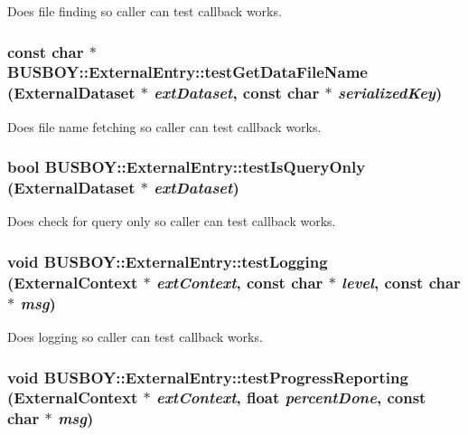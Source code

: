 Does file finding so caller can test callback works. \hypertarget{classBUSBOY_1_1ExternalEntry_af28fbb5390f40892e2fce951a31d8d97}{
\subsubsection[{testGetDataFileName}]{\setlength{\rightskip}{0pt plus 5cm}const char $\ast$ BUSBOY::ExternalEntry::testGetDataFileName ({\bf ExternalDataset} $\ast$ {\em extDataset}, \/  const char $\ast$ {\em serializedKey})}}
\label{classBUSBOY_1_1ExternalEntry_af28fbb5390f40892e2fce951a31d8d97}


Does file name fetching so caller can test callback works. \hypertarget{classBUSBOY_1_1ExternalEntry_a84e84bbd282bd8a16656e9c842275305}{
\subsubsection[{testIsQueryOnly}]{\setlength{\rightskip}{0pt plus 5cm}bool BUSBOY::ExternalEntry::testIsQueryOnly ({\bf ExternalDataset} $\ast$ {\em extDataset})}}
\label{classBUSBOY_1_1ExternalEntry_a84e84bbd282bd8a16656e9c842275305}


Does check for query only so caller can test callback works. \hypertarget{classBUSBOY_1_1ExternalEntry_afcf5fbab9fe9bce1513f90e53ddecbeb}{
\subsubsection[{testLogging}]{\setlength{\rightskip}{0pt plus 5cm}void BUSBOY::ExternalEntry::testLogging ({\bf ExternalContext} $\ast$ {\em extContext}, \/  const char $\ast$ {\em level}, \/  const char $\ast$ {\em msg})}}
\label{classBUSBOY_1_1ExternalEntry_afcf5fbab9fe9bce1513f90e53ddecbeb}


Does logging so caller can test callback works. \hypertarget{classBUSBOY_1_1ExternalEntry_aa8fc3616365460f27b4fdd47eba96672}{
\subsubsection[{testProgressReporting}]{\setlength{\rightskip}{0pt plus 5cm}void BUSBOY::ExternalEntry::testProgressReporting ({\bf ExternalContext} $\ast$ {\em extContext}, \/  float {\em percentDone}, \/  const char $\ast$ {\em msg})}}
\label{classBUSBOY_1_1ExternalEntry_aa8fc3616365460f27b4fdd47eba96672}


